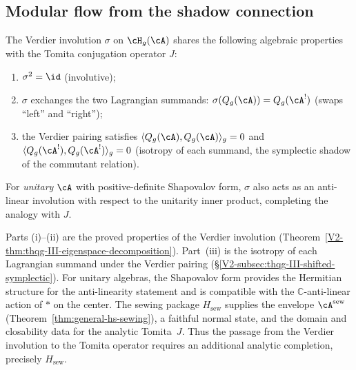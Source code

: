 \subsection{Modular flow from the shadow connection}
\label{subsec:thqg-entanglement-modular-flow}

\begin{conjecture}
\label{conj:thqg-tomita-from-verdier}
The Verdier involution $\sigma$ on $\cH_g(\cA)$
shares the following algebraic properties with the Tomita
conjugation operator $J$:
\begin{enumerate}[label=\textup{(\roman*)}]
\item $\sigma^2 = \id$ \textup{(}involutive\textup{)};
\item $\sigma$ exchanges the two Lagrangian summands:
 $\sigma(Q_g(\cA)) = Q_g(\cA^!)$ \textup{(}swaps ``left''
 and ``right''\textup{)};
\item the Verdier pairing satisfies
 $\langle Q_g(\cA), Q_g(\cA) \rangle_g = 0$ and
 $\langle Q_g(\cA^!), Q_g(\cA^!) \rangle_g = 0$
 \textup{(}isotropy of each summand, the symplectic shadow of
 the commutant relation\textup{)}.
\end{enumerate}
For \emph{unitary} $\cA$ with positive-definite Shapovalov form,
$\sigma$ also acts as an anti-linear involution
with respect to the unitarity inner product, completing the
analogy with $J$.
\end{conjecture}

\begin{remark}
Parts (i)--(ii) are the proved properties of the Verdier
involution
(Theorem~\ref{V2-thm:thqg-III-eigenspace-decomposition}).
Part~(iii) is the isotropy of each Lagrangian summand under
the Verdier pairing
(\S\ref{V2-subsec:thqg-III-shifted-symplectic}).
For unitary algebras, the Shapovalov form provides the Hermitian
structure for the anti-linearity statement and is
compatible with the $\mathbb{C}$-anti-linear action of $*$ on the
center.  The sewing package $H_{\mathrm{sew}}$ supplies the envelope
$\cA^{\mathrm{sew}}$ (Theorem~\ref{thm:general-hs-sewing}), a faithful
normal state, and the domain and closability data for the analytic
Tomita~$J$.  Thus the passage from the Verdier involution to the
Tomita operator requires an additional
analytic completion, precisely $H_{\mathrm{sew}}$.
\end{remark}

